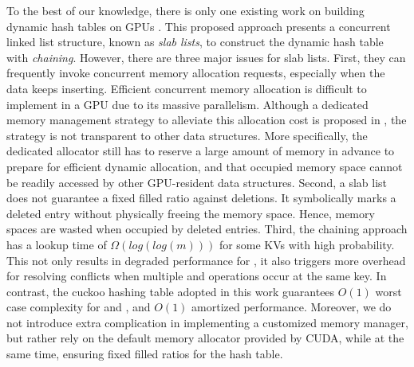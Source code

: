 To the best of our knowledge, there is only one existing work on building dynamic hash tables on GPUs \cite{ashkiani2018dynamic}.
This proposed approach presents a concurrent linked list structure, known as \emph{slab lists}, to construct the dynamic hash table with \emph{chaining}. 
However, there are three major issues for slab lists.
First, they can frequently invoke concurrent memory allocation requests, especially when the data keeps inserting. Efficient concurrent memory allocation is difficult to implement in a GPU due to its massive parallelism. Although a dedicated memory management strategy to alleviate this allocation cost is proposed in \cite{ashkiani2018dynamic}, the strategy is not transparent to other data structures. More specifically, the dedicated allocator still has to reserve a large amount of memory in advance to prepare for efficient dynamic allocation, and that occupied memory space cannot be readily accessed by other GPU-resident data structures. 
Second, a slab list does not guarantee a fixed filled ratio against deletions. 
It symbolically marks a deleted entry without physically freeing the memory space. 
Hence, memory spaces are wasted when occupied by deleted entries. 
Third, the chaining approach has a lookup time of $\Omega(log(log(m)))$ for some KVs with high probability. This not only results in degraded performance for , it also triggers more overhead for resolving conflicts when multiple  and  operations occur at the same key.
In contrast, the cuckoo hashing table adopted in this work guarantees $O(1)$ worst case complexity for  and , 
and $O(1)$ amortized  performance. Moreover, we do not introduce extra complication in implementing a customized memory manager, but rather rely on the default memory allocator provided by CUDA, while at the same time, ensuring fixed filled ratios for the hash table.